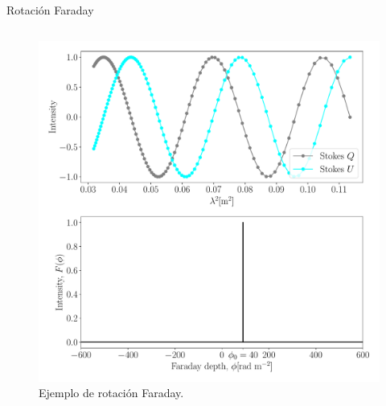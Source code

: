 \documentclass[xetex,aspectratio=169]{beamer}
\begin{document}
	\begin{frame}{Rotación Faraday}
		\begin{columns}
			
			\begin{column}{0.55\textwidth}
				
				
				
				
				\begin{figure}
					\centering
					\includegraphics[width=\textwidth, height=.7\textheight, keepaspectratio]{figures/faraday_rotation/simulation.pdf}
					\caption*{Ejemplo de rotación Faraday.}
				\end{figure}
				

\end{column}
\end{columns}
\end{frame}
\end{document}

